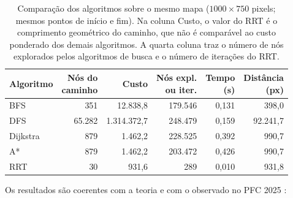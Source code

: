 \documentclass[
    12pt,
    openright,
    oneside,
    a4paper,
    english,
    brazil
]{abntex2}
\begin{document}
\begin{table}[H]
    \centering
    \caption{Comparação dos algoritmos sobre o mesmo mapa ($1000 \times 750$ pixels; mesmos pontos de início e fim). Na coluna Custo, o valor do RRT é o comprimento geométrico do caminho, que não é comparável ao custo ponderado dos demais algoritmos. A quarta coluna traz o número de nós explorados pelos algoritmos de busca e o número de iterações do RRT.}
    \label{tab:comparacao_algoritmos}
    \small
    \setlength{\tabcolsep}{5pt}
    \begin{tabular}{lrrrrr}
        \toprule
        \textbf{Algoritmo}
            & \shortstack[r]{\textbf{Nós do}\\\textbf{caminho}}
            & \textbf{Custo}
            & \shortstack[r]{\textbf{Nós expl.}\\\textbf{ou iter.}}
            & \shortstack[r]{\textbf{Tempo}\\\textbf{(s)}}
            & \shortstack[r]{\textbf{Distância}\\\textbf{(px)}} \\
        \midrule
        BFS      &    351 &    12.838,8 & 179.546 & 0,131 &    398,0 \\
        DFS      & 65.282 & 1.314.372,7 & 248.479 & 0,159 & 92.241,7 \\
        Dijkstra &    879 &     1.462,2 & 228.525 & 0,392 &    990,7 \\
        A*       &    879 &     1.462,2 & 203.472 & 0,426 &    990,7 \\
        RRT      &     30 &       931,6 &     289 & 0,010 &    931,8 \\
        \bottomrule
    \end{tabular}
\end{table}

Os resultados são coerentes com a teoria e com o observado no PFC 2025 \cite{camelo2025}:
\end{document}
